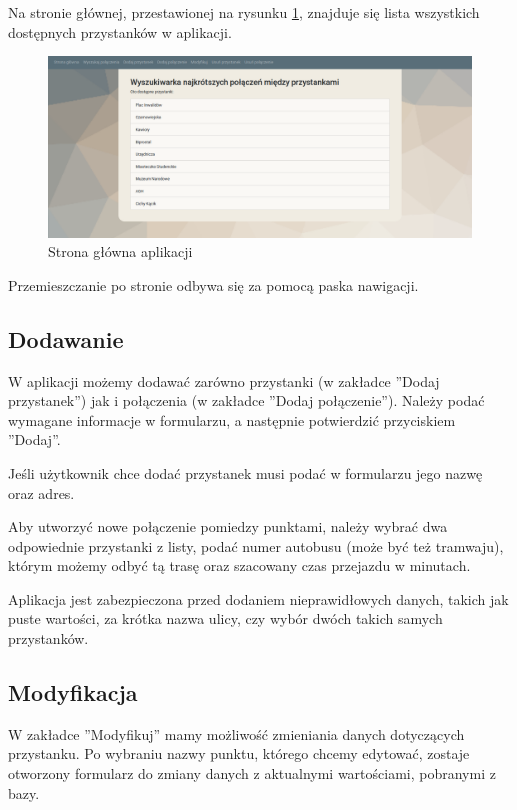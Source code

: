 \documentclass[12pt]{article}
\begin{document}
Na stronie głównej, przestawionej na rysunku \ref{fig:rys1}, znajduje się lista wszystkich dostępnych przystanków w aplikacji.

\begin{figure}[h]
\begin{center}
\includegraphics[width=14cm]{strona.png} 
\caption{Strona główna aplikacji} \label{fig:rys1}
\end{center}
\end{figure}

Przemieszczanie po stronie odbywa się za pomocą paska nawigacji.

\subsection{Dodawanie}
W aplikacji możemy dodawać zarówno przystanki (w zakładce ''Dodaj przystanek'') jak i połączenia (w zakładce ''Dodaj połączenie''). Należy podać wymagane informacje w formularzu, a następnie potwierdzić przyciskiem ''Dodaj''.

Jeśli użytkownik chce dodać przystanek musi podać w formularzu jego nazwę oraz adres. 

Aby utworzyć nowe połączenie pomiedzy punktami, należy wybrać dwa odpowiednie przystanki z listy, podać numer autobusu (może być też tramwaju), którym możemy odbyć tą trasę oraz szacowany czas przejazdu w minutach.

Aplikacja jest zabezpieczona przed dodaniem nieprawidłowych danych, takich jak puste wartości, za krótka nazwa ulicy, czy wybór dwóch takich samych przystanków.

\subsection{Modyfikacja}
W zakładce ''Modyfikuj'' mamy możliwość zmieniania danych dotyczących przystanku. Po wybraniu nazwy punktu, którego chcemy edytować, zostaje otworzony formularz do zmiany danych z aktualnymi wartościami, pobranymi z bazy.
\end{document}
